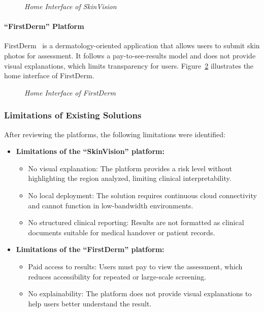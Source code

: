 	\begin{figure}[H]
	  \centering
	  \caption{\textit{Home Interface of SkinVision~\cite{SkinVision}}}
	  \label{fig:skinvision}
	\end{figure}
	
	\paragraph{``FirstDerm'' Platform}
	
	FirstDerm~\cite{FirstDerm} is a dermatology-oriented application that allows users to submit skin photos for assessment. It follows a pay-to-see-results model and does not provide visual explanations, which limits transparency for users. Figure~\ref{fig:firstderm} illustrates the home interface of FirstDerm.
	
	\begin{figure}[H]
	  \centering
	  \caption{\textit{Home Interface of FirstDerm~\cite{FirstDerm}}}
	  \label{fig:firstderm}
	\end{figure}
	
	\subsubsection{Limitations of Existing Solutions}
	
	After reviewing the platforms, the following limitations were identified:
	
	\begin{itemize}
	  \item \textbf{Limitations of the ``SkinVision'' platform:}
	    \begin{itemize}
	      \item No visual explanation: The platform provides a risk level without highlighting
	            the region analyzed, limiting clinical interpretability.
	      \item No local deployment: The solution requires continuous cloud connectivity and
	            cannot function in low-bandwidth environments.
	      \item No structured clinical reporting: Results are not formatted as clinical
	            documents suitable for medical handover or patient records.
	    \end{itemize}
	
	  \item \textbf{Limitations of the ``FirstDerm'' platform:}
	    \begin{itemize}
	      \item Paid access to results: Users must pay to view the assessment, which reduces
	            accessibility for repeated or large-scale screening.
	      \item No explainability: The platform does not provide visual explanations to help
	            users better understand the result.
	    \end{itemize}
	\end{itemize}
	


